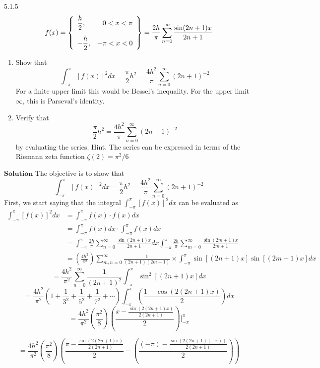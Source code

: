 \documentclass{article}
\begin{document}
\begin{flushleft}
\begin{mybox}{5.1.5}
$$
f(x)=\left\{\begin{array}{lr}
\dfrac{h}{2}, & 0<x<\pi \vspace{3mm}\\
-\dfrac{h}{2}, & -\pi<x<0
\end{array}\right\}=\frac{2 h}{\pi} \sum_{n=0}^{\infty} \frac{\sin (2 n+1) x}{2 n+1}
$$
\begin{enumerate}[$a)$]
\item Show that
$$
\int_{-\pi}^{\pi}[f(x)]^{2} d x=\frac{\pi}{2} h^{2}=\frac{4 h^{2}}{\pi} \sum_{n=0}^{\infty}(2 n+1)^{-2}
$$
For a finite upper limit this would be Bessel's inequality. For the upper limit $\infty$, this is Parseval's identity.
\item Verify that
$$
\frac{\pi}{2} h^{2}=\frac{4 h^{2}}{\pi} \sum_{n=0}^{\infty}(2 n+1)^{-2}
$$
by evaluating the series. Hint. The series can be expressed in terms of the Riemann zeta function $\zeta(2)=\pi^{2} / 6$
\end{enumerate}
\end{mybox}




$\boxed{\textbf{Solution}}$ The objective is to show that 
$$
\int_{-\pi}^{\pi}[f(x)]^{2} d x=\frac{\pi}{2} h^{2}=\frac{4 h^{2}}{\pi} \sum_{n=0}^{\infty}(2 n+1)^{-2}
$$
First, we start saying that the integral $\int_{-\pi}^{\pi}[f(x)]^{2} d x$ can be evaluated as
$$
\begin{aligned}
\int_{-\pi}^{\pi}[f(x)]^{2} d x &=\int_{-\pi}^{\pi} f(x) \cdot f(x) d x \\
&=\int_{-\pi}^{\pi} f(x) d x \cdot \int_{-\pi}^{\pi} f(x) d x \\
&=\int_{-\pi}^{\pi} \frac{2 h}{\pi} \sum_{n=0}^{\infty} \frac{\sin (2 n+1) x}{2 n+1} d x \int_{-\pi}^{\pi} \frac{2 h}{\pi} \sum_{m=0}^{\infty} \frac{\sin (2 m+1) x}{2 m+1} \\
&=\left(\frac{4 h^{2}}{\pi^{2}}\right) \sum_{m, n=0}^{\infty} \frac{1}{(2 n+1)(2 m+1)} \times \int_{-\pi}^{\pi} \sin [(2 n+1) x] \sin [(2 m+1) x] d x
\end{aligned}
$$
$$=\frac{4 h^{2}}{\pi^{2}} \sum_{n=0}^{\infty} \frac{1}{(2 n+1)^{2}} \int_{-\pi}^{\pi} \sin ^{2}[(2 n+1) x] d x$$
$$=\frac{4 h^{2}}{\pi^{2}}\left(1+\frac{1}{3^{2}}+\frac{1}{5^{2}}+\frac{1}{7^{2}}+\cdots\right) \int_{-\pi}^{\pi}\left(\frac{1-\cos (2(2 n+1) x)}{2}\right) d x$$
$$
=\frac{4 h^{2}}{\pi^{2}}\left(\frac{\pi^{2}}{8}\right)\left(\frac{x-\frac{\sin (2(2 n+1) x)}{2(2 n+1)}}{2}\right)\Bigg|_{-\pi}^{\pi}
$$

$$
=\frac{4 h^{2}}{\pi^{2}}\left(\frac{\pi^{2}}{8}\right)\left(\frac{\pi-\frac{\sin (2(2 n+1) \pi)}{2(2 n+1)}}{2}-\left(\frac{(-\pi)-\frac{\sin (2(2 n+1)(-\pi))}{2(2 n+1)}}{2}\right)\right)
$$


\end{flushleft}
\end{document}
